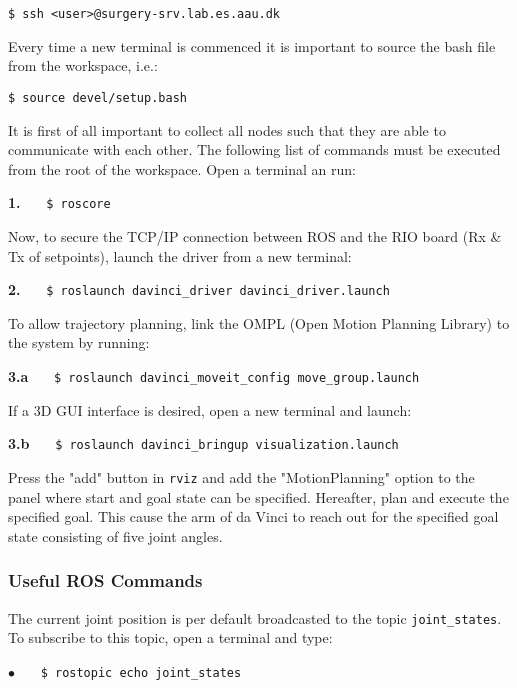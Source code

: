 \hspace{1cm} \texttt{\$ ssh <user>@surgery-srv.lab.es.aau.dk}

Every time a new terminal is commenced it is important to source the bash file from the workspace, i.e.:

\hspace{1cm} \texttt{\$ source devel/setup.bash}

It is first of all important to collect all \gls{node}s such that they are able to communicate with each other. The following list of commands must be executed from the root of the workspace. Open a terminal an run:

\hspace{1cm} \textbf{1.} \ \ \ \texttt{\$ roscore} \ \ \ {}

Now, to secure the TCP/IP connection between ROS and the RIO board (Rx \& Tx of setpoints), launch the driver from a new terminal:

\hspace{1cm} \textbf{2.} \ \ \  \texttt{\$ roslaunch davinci\_driver davinci\_driver.launch} \ \ \ {} 

To allow trajectory planning, link the OMPL (Open Motion Planning Library) to the system by running: 

\hspace{1cm} \textbf{3.a} \ \ \  \texttt{\$ roslaunch davinci\_moveit\_config move\_group.launch} \ \ \ {} 

If a 3D GUI interface is desired, open a new terminal and launch:

\hspace{1cm} \textbf{3.b} \ \ \  \texttt{\$ roslaunch davinci\_bringup visualization.launch} \ \ \ {} 

Press the "add" button in \texttt{rviz} and add the "MotionPlanning" option to the panel where start and goal state can be specified. Hereafter, plan and execute the specified goal. This cause the arm of da Vinci to reach out for the specified goal state consisting of five joint angles.

\subsubsection*{Useful ROS Commands}
The current joint position is per default broadcasted to the topic \texttt{joint\_states}. To subscribe to this topic, open a terminal and type:

\hspace{1cm} \textbf{$\bullet$} \ \ \  \texttt{\$ rostopic echo joint\_states} \ \ \ {} 
